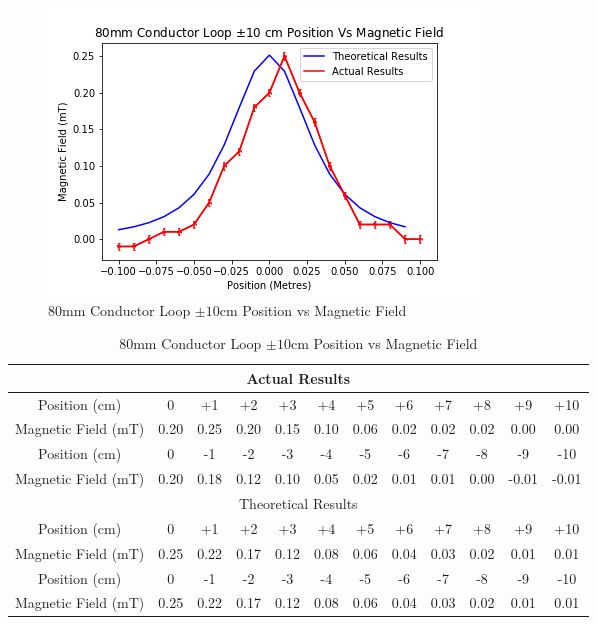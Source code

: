 \documentclass[12pt]{article}
\begin{document}
\begin{figure}[H]
\centering
\includegraphics[scale=0.7]{Images/Conductors/80mm_CL_Position(cm)_Vs_Magnetic_Field_Graph.png}
\caption{80mm Conductor Loop $\pm10$cm Position vs Magnetic Field}
\label{80mm CL Positon Vs Magnetic Field Graph}
\end{figure}

\begin{table}[H]
\begin{center}
 \footnotesize
 \begin{tabular}{|c||c|c|c|c|c|c|c|c|c|c|c|}
 \hline
 \multicolumn{12}{|c|}{Actual Results} \\
 \hline
 Position (cm) & 0 & +1 & +2 & +3 & +4 & +5 & +6 & +7 & +8 & +9 & +10 \\
 \hline
 Magnetic Field (mT) & 0.20 & 0.25 & 0.20 & 0.15 & 0.10 & 0.06 & 0.02 & 0.02 & 0.02 & 0.00 & 0.00 \\
 \hline
 Position (cm) & 0 & -1 & -2 & -3 & -4 & -5 & -6 & -7 & -8 & -9 & -10 \\
 \hline
 Magnetic Field (mT) & 0.20 & 0.18 & 0.12 & 0.10 & 0.05 & 0.02 & 0.01 & 0.01 & 0.00 & -0.01 & -0.01 \\
 \hline
 \hline
 \multicolumn{12}{|c|}{Theoretical Results} \\
 \hline
 Position (cm) & 0 & +1 & +2 & +3 & +4 & +5 & +6 & +7 & +8 & +9 & +10 \\
 \hline
 Magnetic Field (mT) & 0.25 & 0.22 & 0.17 & 0.12 & 0.08 & 0.06 & 0.04 & 0.03 & 0.02 & 0.01 & 0.01 \\
 \hline
 Position (cm) & 0 & -1 & -2 & -3 & -4 & -5 & -6 & -7 & -8 & -9 & -10 \\
 \hline
 Magnetic Field (mT) & 0.25 & 0.22 & 0.17 & 0.12 & 0.08 & 0.06 & 0.04 & 0.03 & 0.02 & 0.01 & 0.01 \\
 \hline
 \end{tabular}
 \caption{80mm Conductor Loop $\pm10$cm Position vs Magnetic Field}
 \label{80mm CL Postion Vs Magnetic Field Table}
\end{center}
\end{table}
\end{document}
